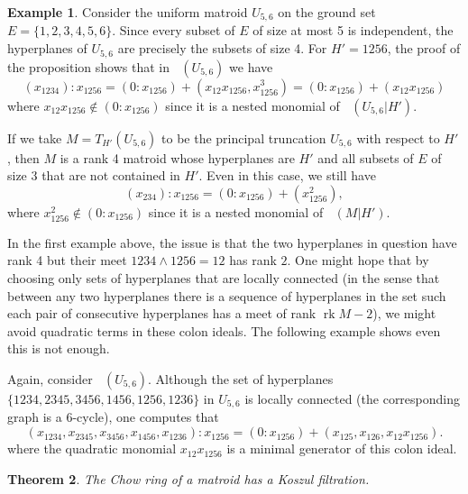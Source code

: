 \documentclass[11pt, reqno]{amsart}
\DeclareMathOperator{\Chow}{\underline{CH}}		%
\DeclareMathOperator{\rk}{rk}
\newtheorem{thm}{Theorem}[section]
\theoremstyle{definition}
\newtheorem{example}[thm]{Example}
\numberwithin{equation}{section}
\numberwithin{table}{section}
\begin{document}
\begin{spacing}{1.1}
\begin{example} \label{good:sets:of:hyperplanes:obstruction:1}
Consider the uniform matroid $U_{5,6}$ on the ground set $E = \{1, 2, 3, 4, 5, 6\}$.  Since every subset of $E$ of size at most 5 is independent, the hyperplanes of $U_{5, 6}$ are precisely the subsets of size 4.  For $H' = 1256$, the proof of the proposition shows that in $\Chow(U_{5,6})$ we have
\[ 
(x_{1234}) : x_{1256} = (0 : x_{1256} ) + (x_{12}x_{1256}, x_{1256}^3)  = (0 : x_{1256} ) + (x_{12}x_{1256}) 
\]
where $x_{12}x_{1256} \notin (0 : x_{1256})$ since it is a nested monomial of $\Chow(U_{5,6}\vert H')$.

If we take $M = T_{H'}(U_{5,6})$ to be the principal truncation $U_{5,6}$ with respect to $H'$, then $M$ is a rank 4 matroid whose hyperplanes are $H'$ and all subsets of $E$ of size 3 that are not contained in $H'$.  Even in this case, we still have
\[ 
(x_{234}) : x_{1256} = (0 : x_{1256} ) + (x_{1256}^2),
\]
where $x_{1256}^2 \notin (0 : x_{1256})$ since it is a nested monomial of $\Chow(M\vert H')$.

In the first example above, the issue is that the two hyperplanes in question have rank 4 but their meet $1234 \wedge 1256 = 12$ has rank $2$.  One might hope that by choosing only sets of hyperplanes that are locally connected (in the sense that between any two hyperplanes there is a sequence of hyperplanes in the set such each pair of consecutive hyperplanes has a meet of rank $\rk M - 2$), we might avoid quadratic terms in these colon ideals.  The following example shows even this is not enough.

Again, consider $\Chow(U_{5,6})$.  Although the set of hyperplanes $\{1234,2345,3456,1456,1256,1236\}$ in $U_{5,6}$ is locally connected (the corresponding graph is a $6$-cycle), one computes that
\[
(x_{1234},x_{2345},x_{3456},x_{1456},x_{1236}):x_{1256} = (0:x_{1256}) + (x_{125},x_{126},x_{12}x_{1256}).\]
where the quadratic monomial $x_{12}x_{1256}$ is a minimal generator of this colon ideal.  \end{example}

\begin{thm} \label{Chow:rings:of:matroids:are:Koszul}
The Chow ring of a matroid has a Koszul filtration.  
\end{thm}


\end{spacing}
\end{document}

